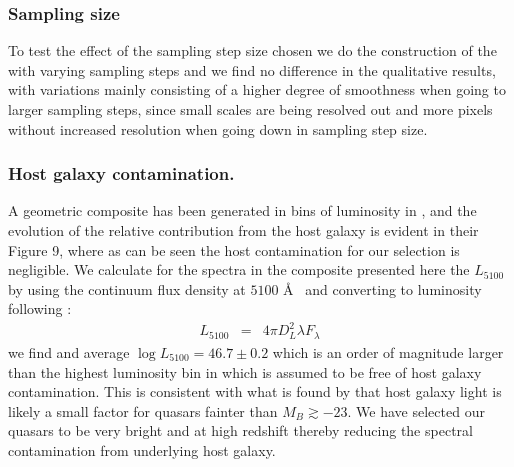 \documentclass{aa}    %
\newcommand{\eqlabel}[1]{\label{eq:#1}}
\newcommand{\sectlabel}[1]{\label{sect:#1}}
\begin{document}
{%
\subsubsection{Sampling size}  \sectlabel{Sampling size}
To test the effect of the sampling step size chosen we do the construction of the with varying sampling steps and we find no difference in the qualitative results, with variations mainly consisting of a higher degree of smoothness when going to larger sampling steps, since small scales are being resolved out and more pixels without increased resolution when going down in sampling step size. 

 
 \subsubsection{Host galaxy contamination.}  \sectlabel{Host galaxy contamination.}
A geometric composite has been generated in bins of luminosity in \citep{Shen2011}, and the evolution of the relative contribution from the host galaxy is evident in their Figure 9, where as can be seen the host contamination for our selection is negligible. We calculate for the spectra in the composite presented here the $L_{5100}$ by using the continuum flux density at $5100$ \AA~ and converting to luminosity following \cite{Netzer2007}:
\begin{eqnarray}\eqlabel{l5100}
L_{5100} &=&    4 \pi D_{L} ^{2} \lambda  F_{\lambda}
\end{eqnarray}
we find and average $\log L_{5100} = 46.7 \pm 0.2$ which is an order of magnitude larger than the highest luminosity bin in \cite{Shen2011} which is assumed to be free of host galaxy contamination. This
is consistent with what is found by \citep{Hopkins2007} that host galaxy light is likely a small factor for quasars fainter than $M_{B} \gtrsim -23$. We have selected our quasars to be very bright and at high redshift thereby reducing the spectral contamination from underlying host galaxy. 









}
\end{document}
